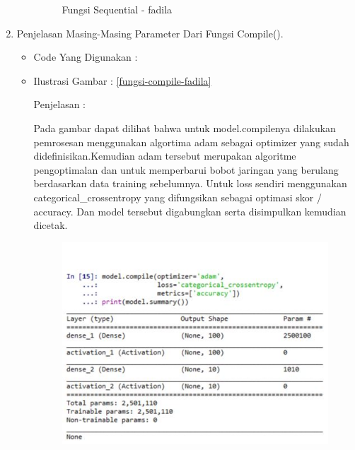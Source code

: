 \begin{enumerate}
\begin{itemize}
\begin{figure}[!hbtp]
\caption{Fungsi Sequential - fadila}
\label{fungsi-sequential-fadila}
\end{figure}
\par
\end{itemize}
\par
\par
\par
\par
\item Penjelasan Masing-Masing Parameter Dari Fungsi Compile().
\begin{itemize}
\item Code Yang Digunakan :
\par

\par
\par
\item Ilustrasi Gambar : \ref{fungsi-compile-fadila}
\par
\par Penjelasan :
\par Pada gambar dapat dilihat bahwa untuk model.compilenya dilakukan pemrosesan menggunakan algortima adam sebagai optimizer yang sudah didefinisikan.Kemudian adam tersebut merupakan algoritme pengoptimalan dan untuk memperbarui bobot jaringan yang berulang berdasarkan data training sebelumnya. Untuk loss sendiri menggunakan categorical\_crossentropy yang difungsikan sebagai optimasi skor / accuracy. Dan model tersebut digabungkan serta disimpulkan kemudian dicetak.
\par
\begin{figure}[!hbtp]
\centering
\includegraphics[scale=0.2]{figures/fungsi-compile-fadila.jpg}

\end{figure}
\end{itemize}
\end{enumerate}
